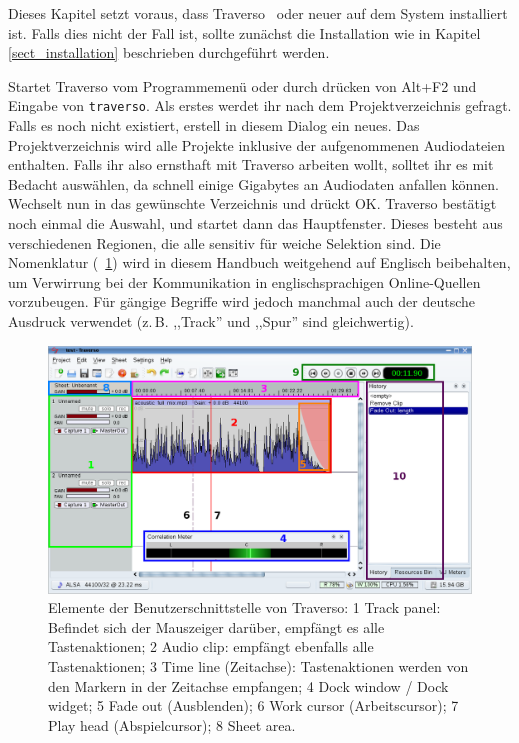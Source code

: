 Dieses Kapitel setzt voraus, dass Traverso \Version\ oder neuer auf dem System installiert ist. Falls dies nicht der Fall ist, sollte zunächst die Installation wie in Kapitel \ref{sect_installation} beschrieben durchgeführt werden.

Startet Traverso vom Programmemenü oder durch drücken von Alt+F2 und Eingabe von \texttt{traverso}. Als erstes werdet ihr nach dem Projektverzeichnis gefragt. Falls es noch nicht existiert, erstell in diesem Dialog ein neues. Das Projektverzeichnis wird alle Projekte inklusive der aufgenommenen Audiodateien enthalten. Falls ihr also ernsthaft mit Traverso arbeiten wollt, solltet ihr es mit Bedacht auswählen, da schnell einige Gigabytes an Audiodaten anfallen können. Wechselt nun in das gewünschte Verzeichnis und drückt OK. Traverso bestätigt noch einmal die Auswahl, und startet dann das Hauptfenster. Dieses besteht aus verschiedenen Regionen, die alle sensitiv für weiche Selektion sind. Die Nomenklatur (\FigB\ \ref{fig_gui01}) wird in diesem Handbuch weitgehend auf Englisch beibehalten, um Verwirrung bei der Kommunikation in englischsprachigen Online-Quellen vorzubeugen. Für gängige Begriffe wird jedoch manchmal auch der deutsche Ausdruck verwendet (z.\,B. ,,Track'' und ,,Spur'' sind gleichwertig).

\begin{figure}
 \centering\includegraphics[width=\textwidth]{../images/sshot06.png}
 \caption{Elemente der Benutzerschnittstelle von Traverso: 1 Track panel: Befindet sich der Mauszeiger darüber, empfängt es alle Tastenaktionen; 2 Audio clip: empfängt ebenfalls alle Tastenaktionen; 3 Time line (Zeitachse): Tastenaktionen werden von den Markern in der Zeitachse empfangen; 4 Dock window / Dock widget; 5 Fade out (Ausblenden); 6 Work cursor (Arbeitscursor); 7 Play head (Abspielcursor); 8 Sheet area.}
 \label{fig_gui01}
\end{figure}

